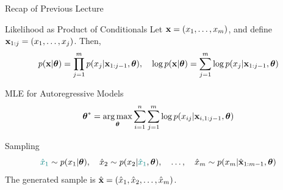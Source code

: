 \documentclass{beamer}
\begin{document}
\begin{frame}{Recap of Previous Lecture}
	\begin{block}{Likelihood as Product of Conditionals}
		Let $\mathbf{x} = (x_1, \dots, x_m)$, and define $\mathbf{x}_{1:j} = (x_1, \dots, x_j)$. Then,
		\[
		p(\mathbf{x} | \boldsymbol{\theta}) = \prod_{j=1}^m p(x_j | \mathbf{x}_{1:j-1}, \boldsymbol{\theta}), \quad 
		\log p(\mathbf{x} | \boldsymbol{\theta}) = \sum_{j=1}^m \log p(x_j | \mathbf{x}_{1:j-1}, \boldsymbol{\theta})
		\]
	\end{block}
	\vspace{-0.3cm}
	\begin{block}{MLE for Autoregressive Models}
		\vspace{-0.3cm}
		\[
		\boldsymbol{\theta}^* = \operatorname*{arg\,max}_{\boldsymbol{\theta}} \sum_{i=1}^n \sum_{j=1}^m \log p(x_{ij} | \mathbf{x}_{i, 1:j-1}, \boldsymbol{\theta})
		\]
		\vspace{-0.5cm}
	\end{block}
	\begin{block}{Sampling}
		\vspace{-0.5cm}
		\[
		{\color{teal} \hat{x}_1} \sim p(x_1 | \boldsymbol{\theta}), \quad \hat{x}_2 \sim p(x_2 | {\color{teal} \hat{x}_1}, \boldsymbol{\theta}), \quad \ldots, \quad \hat{x}_m \sim p(x_m | \hat{\mathbf{x}}_{1:m-1}, \boldsymbol{\theta})
		\]
		The generated sample is $\hat{\mathbf{x}} = (\hat{x}_1, \hat{x}_2, \dots, \hat{x}_m)$.
	\end{block}
\end{frame}
\end{document}
